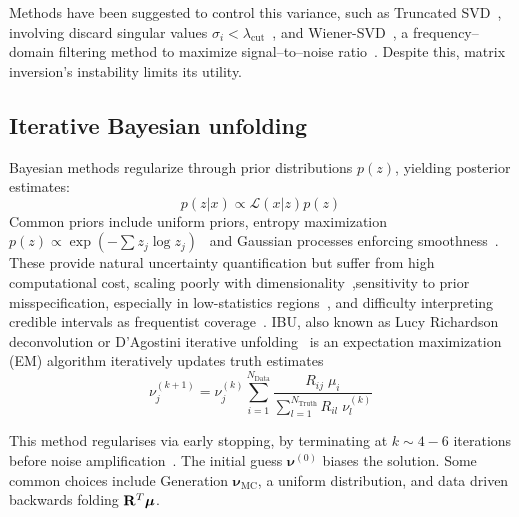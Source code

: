 Methods have been suggested to control this variance, such as Truncated SVD~\cite{deng_fast_2024}, involving discard singular values \(\sigma_i < \lambda_{\text{cut}}\)~\cite{TruncatedSVDDocumentation}, and Wiener-SVD~\cite{tang_data_2017}, a frequency--domain filtering method to maximize signal--to--noise ratio~\cite{zaroubi_wiener_1995}.
%
Despite this, matrix inversion's instability limits its utility.

\subsection{Iterative Bayesian unfolding}
Bayesian methods regularize through prior distributions \(p(z)\), yielding posterior estimates:  
\begin{equation}
    p({z}|{x}) \propto \mathcal{L}({x}|{z})p({z})
\end{equation}  
Common priors include uniform priors, entropy maximization \(p(z) \propto \exp(-\sum z_j \log z_j)\)~\cite{maeda_new_2013} and Gaussian processes enforcing smoothness~\cite{bozson_unfolding_2018}.
%
These provide natural uncertainty quantification but suffer from high computational cost, scaling poorly with dimensionality~\cite{cowan_bayesian_2007},sensitivity to prior misspecification, especially in low-statistics regions~\cite{cowan_bayesian_2006}, and difficulty interpreting credible intervals as frequentist coverage~\cite{james_statistics_2004}.
IBU, also known as Lucy Richardson deconvolution or D'Agostini iterative unfolding~\cite{dagostini_improved_2010} is an expectation maximization (EM) algorithm iteratively updates truth estimates
\begin{equation}
    \nu_j^{(k+1)} = \nu_j^{(k)} \sum_{i=1}^{N_{\text{Data}}} \frac{R_{ij}\; \mu_i}{\sum_{l=1}^{N_{\text{Truth}}} R_{il} \;\nu_l^{(k)}}
\end{equation}  

This method regularises via early stopping, by terminating at \(k \sim 4-6\) iterations before noise amplification~\cite{fish_blind_1995, shepp_maximum_1982}.
%
The initial guess \(\boldsymbol{\nu}^{(0)}\) biases the solution.
%
Some common choices include Generation \(\boldsymbol{\nu}_{\text{MC}}\), a uniform distribution, and data driven backwards folding \(\mathbf{R}^T \vb*{\mu}\).

